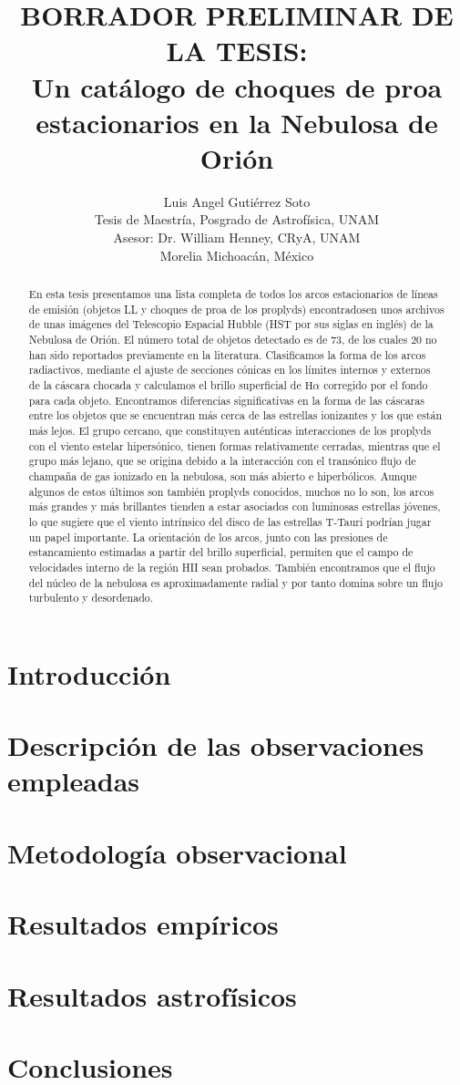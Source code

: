 \documentclass{report}
\title{BORRADOR PRELIMINAR DE LA TESIS:\\
Un catálogo de choques de proa estacionarios en la Nebulosa de Orión}
\author{
  Luis Angel Gutiérrez Soto\\
  Tesis de Maestría, Posgrado de Astrofísica, UNAM\\
  Asesor: Dr. William Henney, CRyA, UNAM\\
  Morelia Michoacán, México
  }
\newcommand\ha{\ensuremath{\mathrm{H}\alpha}}
\begin{document}
\maketitle

\tableofcontents

\begin{abstract}
En esta tesis presentamos una lista completa de todos los arcos estacionarios de líneas de emisión (objetos LL y choques de proa de los proplyds) encontradosen unos archivos de unas imágenes  del Telescopio Espacial Hubble (HST por sus siglas en inglés) de la Nebulosa de Orión. El número total de objetos detectado es de 73, de los cuales 20 no han sido reportados previamente en la literatura. Clasificamos la forma de los arcos radiactivos, mediante el ajuste de secciones cónicas en los límites internos y externos de la cáscara chocada y calculamos el brillo superficial de \ha{} corregido por el fondo para cada objeto. Encontramos diferencias significativas en la forma de las cáscaras entre los objetos que se encuentran más cerca de las estrellas ionizantes y los que están más lejos. El grupo cercano, que constituyen auténticas interacciones de los proplyds con el viento estelar hipersónico, tienen formas relativamente cerradas, mientras que el grupo más lejano, que se origina debido a la interacción con el transónico flujo de champaña de gas ionizado en la nebulosa, son más abierto e hiperbólicos. Aunque algunos de estos últimos son también proplyds conocidos, muchos no lo son, los arcos más grandes y más brillantes tienden a estar asociados con luminosas estrellas jóvenes, lo que sugiere que el viento intrínsico del disco de las estrellas T-Tauri podrían jugar un papel importante. La orientación de los arcos, junto con las presiones de estancamiento estimadas a partir del brillo superficial, permiten que el campo de velocidades interno de la región HII sean probados. También  encontramos que el flujo del núcleo de la nebulosa es aproximadamente radial y por tanto domina sobre un flujo turbulento y desordenado.
\end{abstract}


\chapter{Introducción}

\chapter{Descripción de las observaciones empleadas}

\chapter{Metodología observacional}

\chapter{Resultados empíricos}

\chapter{Resultados astrofísicos}

\chapter{Conclusiones}



\end{document}
